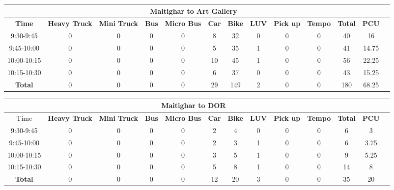 \begin{landscape}
\centering
\begin{table}[h!]
\centering
\begin{tabular}{|c|c|c|c|c|c|c|c|c|c|c|c|c|}
    \hline
    \multicolumn{12}{|c|}{\textbf{Maitighar to Art Gallery}} \\
    \hline
    \textbf{Time} & \textbf{Heavy Truck} & \textbf{Mini Truck} & \textbf{Bus} & \textbf{Micro Bus} & \textbf{Car} & \textbf{Bike} & \textbf{LUV} & \textbf{Pick up} & \textbf{Tempo} & \textbf{\textbf{Total}} & \textbf{PCU} \\
    \hline
9:30-9:45	&0	&0	&0	&0	&8	&32	&0	&0	&0	&40	&16 \\ \hline
9:45-10:00	&0	&0	&0	&0	&5	&35	&1	&0	&0	&41	&14.75 \\ \hline
10:00-10:15	&0	&0	&0	&0	&10	&45	&1	&0	&0	&56	&22.25 \\ \hline
10:15-10:30	&0	&0	&0	&0	&6	&37	&0	&0	&0	&43	&15.25 \\ \hline
\textbf{Total}	&0	&0	&0	&0	&29	&149	&2	&0	&0	&180	&68.25 \\ \hline


\end{tabular}

\vspace{0.5cm}

\begin{tabular}{|c|c|c|c|c|c|c|c|c|c|c|c|c|}
    \hline
    \multicolumn{12}{|c|}{\textbf{Maitighar to DOR}} \\
    \hline
        Time & \textbf{Heavy Truck} & \textbf{Mini Truck} & \textbf{Bus} & \textbf{Micro Bus} & \textbf{Car} & \textbf{Bike} & \textbf{LUV} & \textbf{Pick up} & \textbf{Tempo} & \textbf{\textbf{Total}} & \textbf{PCU} \\
    \hline
    9:30-9:45	&0	&0	&0	&0	&2	&4	&0	&0	&0	&6	&3 \\ \hline
    9:45-10:00	&0	&0	&0	&0	&2	&3	&1	&0	&0	&6	&3.75 \\ \hline
    10:00-10:15	&0	&0	&0	&0	&3	&5	&1	&0	&0	&9	&5.25 \\ \hline
    10:15-10:30	&0	&0	&0	&0	&5	&8	&1	&0	&0	&14	&8 \\ \hline
    \textbf{Total} & 0 & 0 & 0 & 0 & 12 & 20 & 3 & 0 & 0 & 35 & 20 \\ \hline


\end{tabular}
\end{table}
\end{landscape}


